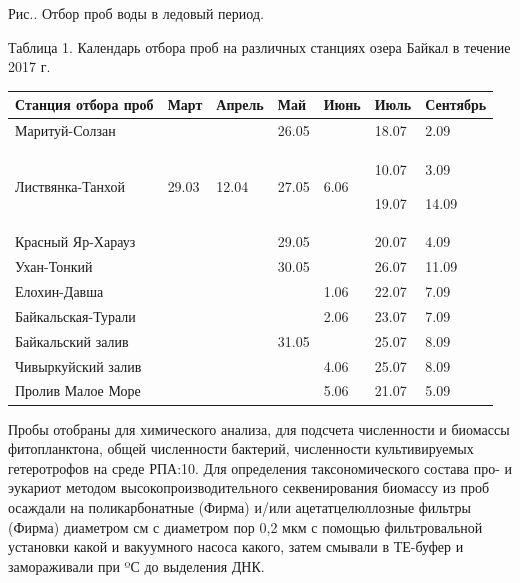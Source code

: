 \documentclass[a4paper,12pt,openany,final]{extreport}
\begin{document}
Рис.. Отбор проб воды в ледовый период.

Таблица 1. Календарь отбора проб на различных станциях озера Байкал в
течение 2017 г.

\begin{longtable}[]{@{}lllllll@{}}
\toprule
Станция отбора проб & Март & Апрель & Май & Июнь & Июль &
Сентябрь\tabularnewline
\midrule
\endhead
Маритуй-Солзан & & & 26.05 & & 18.07 & 2.09\tabularnewline
\begin{minipage}[t]{0.14\columnwidth}\raggedright
Листвянка-Танхой\strut
\end{minipage} & \begin{minipage}[t]{0.14\columnwidth}\raggedright
29.03\strut
\end{minipage} & \begin{minipage}[t]{0.14\columnwidth}\raggedright
12.04\strut
\end{minipage} & \begin{minipage}[t]{0.14\columnwidth}\raggedright
27.05\strut
\end{minipage} & \begin{minipage}[t]{0.14\columnwidth}\raggedright
6.06\strut
\end{minipage} & \begin{minipage}[t]{0.14\columnwidth}\raggedright
10.07

19.07\strut
\end{minipage} & \begin{minipage}[t]{0.14\columnwidth}\raggedright
3.09

14.09\strut
\end{minipage}\tabularnewline
Красный Яр-Харауз & & & 29.05 & & 20.07 & 4.09\tabularnewline
Ухан-Тонкий & & & 30.05 & & 26.07 & 11.09\tabularnewline
Елохин-Давша & & & & 1.06 & 22.07 & 7.09\tabularnewline
Байкальская-Турали & & & & 2.06 & 23.07 & 7.09\tabularnewline
Байкальский залив & & & 31.05 & & 25.07 & 8.09\tabularnewline
Чивыркуйский залив & & & & 4.06 & 25.07 & 8.09\tabularnewline
Пролив Малое Море & & & & 5.06 & 21.07 & 5.09\tabularnewline
\bottomrule
\end{longtable}

Пробы отобраны для химического анализа, для подсчета численности и
биомассы фитопланктона, общей численности бактерий, численности
культивируемых гетеротрофов на среде РПА:10. Для определения
таксономического состава про- и эукариот методом высокопроизводительного
секвенирования биомассу из проб осаждали на поликарбонатные (Фирма)
и/или ацетатцелюллозные фильтры (Фирма) диаметром см с диаметром пор 0,2
мкм с помощью фильтровальной установки какой и вакуумного насоса какого,
затем смывали в ТЕ-буфер и замораживали при ºС до выделения ДНК.
\end{document}

